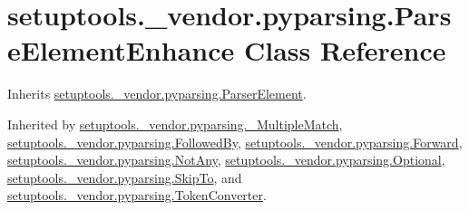 \hypertarget{classsetuptools_1_1__vendor_1_1pyparsing_1_1_parse_element_enhance}{}\section{setuptools.\+\_\+vendor.\+pyparsing.\+Parse\+Element\+Enhance Class Reference}
\label{classsetuptools_1_1__vendor_1_1pyparsing_1_1_parse_element_enhance}


Inherits \hyperlink{classsetuptools_1_1__vendor_1_1pyparsing_1_1_parser_element}{setuptools.\+\_\+vendor.\+pyparsing.\+Parser\+Element}.



Inherited by \hyperlink{classsetuptools_1_1__vendor_1_1pyparsing_1_1___multiple_match}{setuptools.\+\_\+vendor.\+pyparsing.\+\_\+\+Multiple\+Match}, \hyperlink{classsetuptools_1_1__vendor_1_1pyparsing_1_1_followed_by}{setuptools.\+\_\+vendor.\+pyparsing.\+Followed\+By}, \hyperlink{classsetuptools_1_1__vendor_1_1pyparsing_1_1_forward}{setuptools.\+\_\+vendor.\+pyparsing.\+Forward}, \hyperlink{classsetuptools_1_1__vendor_1_1pyparsing_1_1_not_any}{setuptools.\+\_\+vendor.\+pyparsing.\+Not\+Any}, \hyperlink{classsetuptools_1_1__vendor_1_1pyparsing_1_1_optional}{setuptools.\+\_\+vendor.\+pyparsing.\+Optional}, \hyperlink{classsetuptools_1_1__vendor_1_1pyparsing_1_1_skip_to}{setuptools.\+\_\+vendor.\+pyparsing.\+Skip\+To}, and \hyperlink{classsetuptools_1_1__vendor_1_1pyparsing_1_1_token_converter}{setuptools.\+\_\+vendor.\+pyparsing.\+Token\+Converter}.

